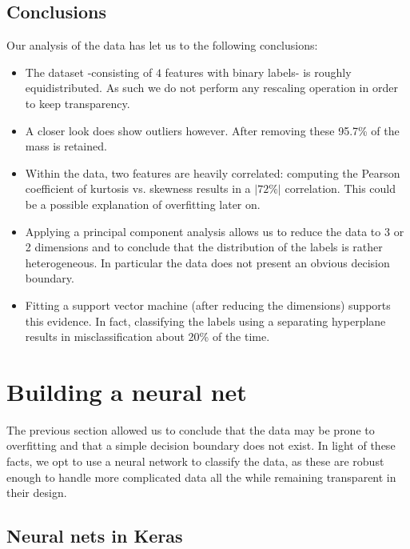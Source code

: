 \documentclass[14pt]{article}
\theoremstyle{plain}
\theoremstyle{definition}
\begin{document}
\subsection{Conclusions}
Our analysis of the data has let us to the following conclusions:
\begin{itemize}
\item The dataset -consisting of $4$ features with binary labels-  is roughly equidistributed. As such  we do not perform any rescaling operation in order to keep transparency.
\item A closer look does show outliers however. After removing these 95.7\% of the mass is retained.
\item Within the data, two features are heavily correlated: computing the Pearson coefficient of kurtosis vs. skewness results in a $\vert 72\%\vert $ correlation. This could be a possible explanation of overfitting later on.
\item Applying a principal component analysis allows us to reduce the data to 3 or 2 dimensions and to conclude that the distribution of the labels is rather heterogeneous. In particular the data does not present an obvious decision boundary.
\item Fitting a support vector machine (after reducing the dimensions) supports this evidence. In fact, classifying the labels using a separating hyperplane results in misclassification about 20\% of the time.
\end{itemize}

\newpage
\section{Building a neural net}
The previous section allowed us to conclude that the data may be prone to overfitting and that a simple decision boundary does not exist. In light of these facts, we opt to use a neural network to classify the data, as these are robust enough to handle more complicated data all the while remaining transparent in their design.
\subsection{Neural nets in Keras} 
\end{document}

